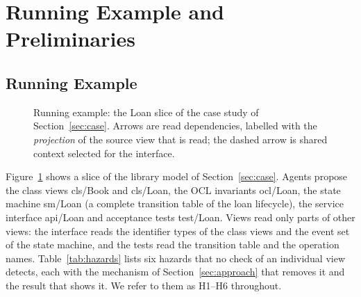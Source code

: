 \documentclass[pdflatex,sn-mathphys-num]{sn-jnl}
\theoremstyle{thmstyleone}%
\theoremstyle{thmstyletwo}%
\theoremstyle{thmstylethree}%
\newcommand{\vw}[1]{\textsf{#1}}
\begin{document}
\section{Running Example and Preliminaries}\label{sec:prelim}

\subsection{Running Example}\label{sec:example}
\begin{figure}[!ht]
\centering
{}
\caption{Running example: the Loan slice of the case study of Section~\ref{sec:case}. Arrows are read dependencies, labelled with the \emph{projection} of the source view that is read; the dashed arrow is shared context selected for the interface.}\label{fig:example}
\end{figure}

Figure~\ref{fig:example} shows a slice of the library model of Section~\ref{sec:case}. Agents propose the class views \vw{cls/Book} and \vw{cls/Loan}, the OCL invariants \vw{ocl/Loan}, the state machine \vw{sm/Loan} (a complete transition table of the loan lifecycle), the service interface \vw{api/Loan} and acceptance tests \vw{test/Loan}. Views read only parts of other views: the interface reads the identifier types of the class views and the event set of the state machine, and the tests read the transition table and the operation names. Table~\ref{tab:hazards} lists six hazards that no check of an individual view detects, each with the mechanism of Section~\ref{sec:approach} that removes it and the result that shows it. We refer to them as H1--H6 throughout.
\end{document}
